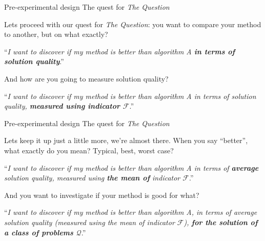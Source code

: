 \documentclass[t]{beamer}
\begin{document}

\begin{ftst}
{Pre-experimental design}
{The quest for \textit{The Question}}
%
Lets proceed with our quest for \textit{The Question}: you want to compare your method to another, but on what exactly?
\pause
\begin{block}{}
\centering``\textit{I want to discover if my method is better than algorithm A \textbf{in terms of solution quality}}.''
\end{block}
\vone\pause
And how are you going to measure solution quality?
\pause
\begin{block}{}
\centering``\textit{I want to discover if my method is better than algorithm A in terms of solution quality, \textbf{measured using indicator $\mathcal{F}$}}.''
\end{block}
\end{ftst}


\begin{ftst}
{Pre-experimental design}
{The quest for \textit{The Question}}
%
Lets keep it up just a little more, we're almost there. When you say ``better'', what exactly do you mean? Typical, best, worst case?
\pause
\begin{block}{}
\centering``\textit{I want to discover if my method is better than algorithm A in terms of \textbf{average} solution quality, measured using \textbf{the mean of} indicator $\mathcal{F}$}.''
\end{block}
\vone
\pause
And you want to investigate if your method is good for what?
\pause
\begin{block}{}
\centering``\textit{I want to discover if my method is better than algorithm A, in terms of average solution quality (measured using the mean of indicator $\mathcal{F}$), \textbf{for the solution of a class of problems $\mathcal{Q}$}}.''
\end{block}
\end{ftst}
\end{document}
